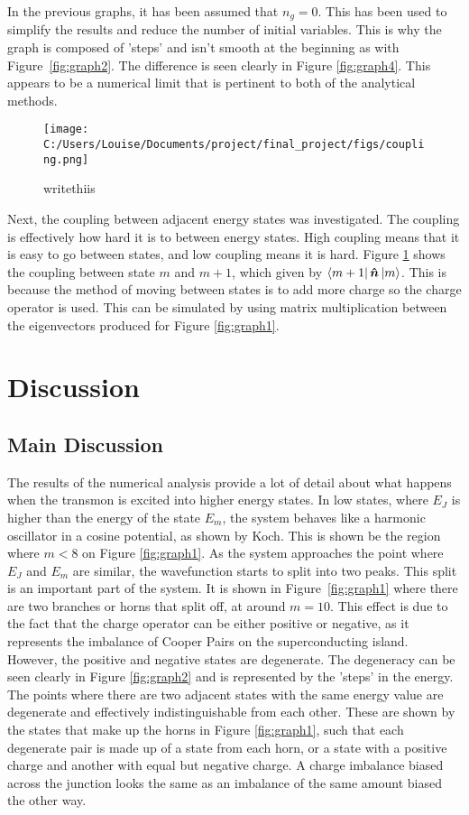 \documentclass[11pt]{article}
\begin{document}
In the previous graphs, it has been assumed that $n_g = 0$. This has been used to simplify the results and reduce the number of initial variables. This is why the graph is composed of 'steps' and isn't smooth at the beginning as with Figure~\ref{fig:graph2}. The difference is seen clearly in Figure  \ref{fig:graph4}. This appears to be a numerical limit that is pertinent to both of the analytical methods.

\begin{figure}[ht]
\centering
\texttt{[image: C:/Users/Louise/Documents/project/final\_project/figs/coupling.png]}
\caption{writethiis}
\label{fig:graph5}
\end{figure}
Next, the coupling between adjacent energy states was investigated. The coupling is effectively how hard it is to between energy states. High coupling means that it is easy to go between states, and low coupling means it is hard. Figure \ref{fig:graph5} shows the coupling between state $m$ and $m+1$, which given by $\bra{m+1}\boldsymbol{\hat{n}}\ket{m}$. This is because the method of moving between states is to add more charge so the charge operator is used. This can be simulated by using matrix multiplication between the eigenvectors produced for Figure \ref{fig:graph1}.

\section{Discussion}
\subsection{Main Discussion}
The results of the numerical analysis provide a lot of detail about what happens when the transmon is excited into higher energy states. In low states, where $E_J$ is higher than the energy of the state $E_m$, the system behaves like a harmonic oscillator in a cosine potential, as shown by Koch. This is shown be the region where $m<8$ on Figure \ref{fig:graph1}. As the system approaches the point where $E_J$ and $E_m$ are similar, the wavefunction starts to split into two peaks. This split is an important part of the system. It is shown in Figure~\ref{fig:graph1} where there are two branches or horns that split off, at around $m=10$. This effect is due to the fact that the charge operator can be either positive or negative, as it represents the imbalance of Cooper Pairs on the superconducting island. However, the positive and negative states are degenerate. The degeneracy can be seen clearly in Figure \ref{fig:graph2} and is represented by the 'steps' in the energy. The points where there are two adjacent states with the same energy value are degenerate and effectively indistinguishable from each other. These are shown by the states that make up the horns in Figure \ref{fig:graph1}, such that each degenerate pair is made up of a state from each horn, or a state with a positive charge and another with equal but negative charge. A charge imbalance biased across the junction looks the same as an imbalance of the same amount biased the other way.
\end{document}
